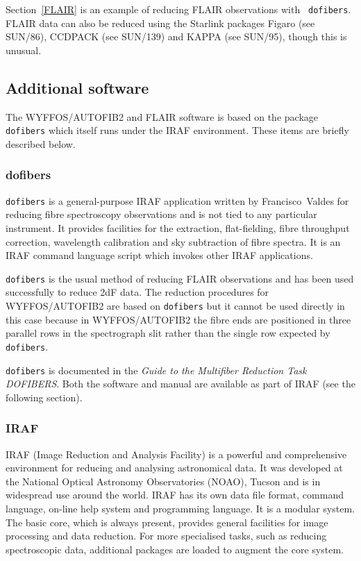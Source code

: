 \documentclass[twoside,11pt]{article}
\newcommand{\xref}[3]{#1}
\begin{document}
Section~\ref{FLAIR} is an example of reducing FLAIR observations with {\tt
dofibers}.  FLAIR data can also be reduced using the Starlink packages
Figaro (see \xref{SUN/86}{sun86}{}\cite{SUN86}),
CCDPACK (see \xref{SUN/139}{sun139}{}\cite{SUN139}) and
KAPPA (see \xref{SUN/95}{sun95}{}\cite{SUN95}), 
though this is unusual.

\subsection{Additional software}

The WYFFOS/AUTOFIB2 and FLAIR software is based on the package {\tt
dofibers} which itself runs under the IRAF environment.  These items
are briefly described below.

\subsubsection{\label{DOFIBERS}dofibers}

{\tt dofibers} is a general-purpose IRAF application written by
Francisco~Valdes for reducing fibre spectroscopy observations and
is not tied to any particular instrument.  It provides facilities for
the extraction, flat-fielding, fibre throughput correction, wavelength
calibration and sky subtraction of fibre spectra.  It is an IRAF
command language script which invokes other IRAF applications.

{\tt dofibers} is the usual method of reducing FLAIR observations and
has been used successfully to reduce 2dF data.  The reduction procedures
for WYFFOS/AUTOFIB2 are based on {\tt dofibers} but it cannot be used
directly in this case because in WYFFOS/AUTOFIB2 the fibre ends are
positioned in three parallel rows in the spectrograph slit rather than
the single row expected by {\tt dofibers}.

{\tt dofibers} is documented in the {\it Guide to the Multifiber
Reduction Task DOFIBERS}\/\cite{VALDES92A}.  Both the software and manual
are available as part of IRAF (see the following section).

\subsubsection{\label{IRAF}IRAF}

IRAF (Image Reduction and Analysis Facility) is a powerful and
comprehensive environment for reducing and analysing astronomical
data.  It was developed at the National Optical Astronomy Observatories
(NOAO), Tucson and is in widespread use around the world.  IRAF has
its own data file format, command language, on-line help system and
programming language.  It is a modular system.  The basic core, which
is always present, provides general facilities for image processing
and data reduction.  For more specialised tasks, such as reducing
spectroscopic data, additional packages are loaded to augment the
core system.
\end{document}
